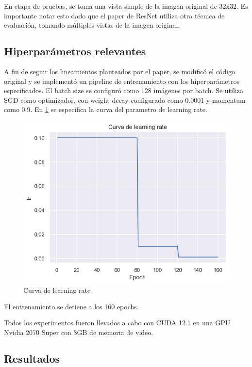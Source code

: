 \documentclass[titlepage,a4paper,oneside]{article}
\begin{document}
En etapa de pruebas, se toma una vista simple de la imagen original de 32x32. Es importante notar esto dado que el paper de ResNet utiliza otra técnica de evaluación, tomando múltiples vistas de la imagen original.

\subsection{Hiperparámetros relevantes}
A fin de seguir los lineamientos planteados por el paper, se modificó el código original y se implementó un pipeline de entrenamiento con los hiperparámetros especificados. El batch size se configuró como 128 imágenes por batch. Se utiliza SGD como optimizador, con weight decay  configurado como 0.0001 y momentum como 0.9. En \ref{lrcurve} se especifica la curva del parametro de learning rate.

\begin{figure}[H]
\centering
\includegraphics[width=\textwidth]{images/lr_curve.png}
\caption{Curva de learning rate}
\label{lrcurve}
\end{figure}

El entrenamiento se detiene a los 160 epochs.

Todos los experimentos fueron llevados a cabo con CUDA 12.1 en una GPU Nvidia 2070 Super con 8GB de memoria de video.

\subsection{Resultados}
\end{document}
